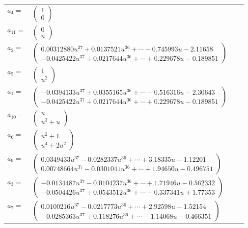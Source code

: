 \documentclass[1p]{elsarticle_modified}
\theoremstyle{definition}
\begin{document}
\begin{tabular}{m{7pt} m{180pt} m{7pt} m{180pt} }
\flushright $a_{4}=$&$\begin{pmatrix}1\\0\end{pmatrix}$ \\
\flushright $a_{11}=$&$\begin{pmatrix}0\\u\end{pmatrix}$ \\
\flushright $a_{2}=$&$\begin{pmatrix}0.00312880 u^{37}+0.0137521 u^{36}+\cdots-0.745993 u-2.11658\\-0.0425422 u^{37}+0.0217644 u^{36}+\cdots+0.229678 u-0.189851\end{pmatrix}$ \\
\flushright $a_{5}=$&$\begin{pmatrix}1\\u^2\end{pmatrix}$ \\
\flushright $a_{1}=$&$\begin{pmatrix}-0.0394133 u^{37}+0.0355165 u^{36}+\cdots-0.516316 u-2.30643\\-0.0425422 u^{37}+0.0217644 u^{36}+\cdots+0.229678 u-0.189851\end{pmatrix}$ \\
\flushright $a_{10}=$&$\begin{pmatrix}u\\u^3+u\end{pmatrix}$ \\
\flushright $a_{6}=$&$\begin{pmatrix}u^2+1\\u^4+2 u^2\end{pmatrix}$ \\
\flushright $a_{9}=$&$\begin{pmatrix}0.0349433 u^{37}-0.0282337 u^{36}+\cdots+3.18335 u-1.12201\\0.00748664 u^{37}-0.0301041 u^{36}+\cdots+1.94650 u-0.496751\end{pmatrix}$ \\
\flushright $a_{3}=$&$\begin{pmatrix}-0.0134487 u^{37}-0.0104237 u^{36}+\cdots+1.71946 u-0.562332\\-0.0504426 u^{37}+0.0543512 u^{36}+\cdots-0.337341 u+1.77353\end{pmatrix}$ \\
\flushright $a_{7}=$&$\begin{pmatrix}0.0100216 u^{37}-0.0217773 u^{36}+\cdots+2.92598 u-1.52154\\-0.0285363 u^{37}+0.118276 u^{36}+\cdots-1.14068 u-0.466351\end{pmatrix}$ \\

\end{tabular}
\end{document}
